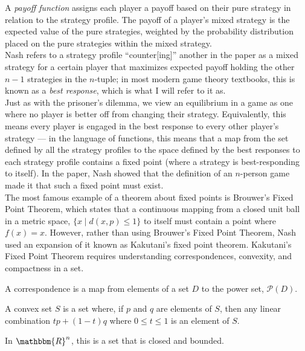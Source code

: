 \documentclass[12pt]{extarticle}
\newcommand{\R}{\mathbbm{R}}
\begin{document}
  A \textit{payoff function} assigns each player a payoff based on their pure strategy in relation to the strategy profile. The payoff of a player's mixed strategy is the expected value of the pure strategies, weighted by the probability distribution placed on the pure strategies within the mixed strategy.\\

  Nash refers to a strategy profile ``counter[ing]'' another in the paper as a mixed strategy for a certain player that maximizes expected payoff holding the other $n-1$ strategies in the $n$-tuple; in most modern game theory textbooks, this is known as a \textit{best response},\supercite{tadelis_game_2023} which is what I will refer to it as.\\

  Just as with the prisoner's dilemma, we view an equilibrium in a game as one where no player is better off from changing their strategy. Equivalently, this means every player is engaged in the best response to every other player's strategy --- in the language of functions, this means that a map from the set defined by all the strategy profiles to the space defined by the best responses to each strategy profile contains a fixed point (where a strategy is best-responding to itself). In the paper, Nash showed that the definition of an $n$-person game made it that such a fixed point must exist.\\

  The most famous example of a theorem about fixed points is Brouwer's Fixed Point Theorem, which states that a continuous mapping from a closed unit ball in a metric space, $\{x\mid d(x,p)\leq 1\}$ to itself must contain a point where $f(x) = x$. However, rather than using Brouwer's Fixed Point Theorem, Nash used an expansion of it known as Kakutani's fixed point theorem. Kakutani's Fixed Point Theorem requires understanding correspondences, convexity, and compactness in a set.
  \begin{description}[font=\normalfont]
    \item[Correspondence:] A correspondence is a map from elements of a set $D$ to the power set, $\mathcal{P}(D)$.
    \item[Convex:] A convex set $S$ is a set where, if $p$ and $q$ are elements of $S$, then any linear combination $tp + (1-t)q$ where $0\leq t \leq 1$ is an element of $S$.\supercite{convex_definition}
    \item[Compact:] In $\R^n$, this is a set that is closed and bounded.
  \end{description}
  
\end{document}
